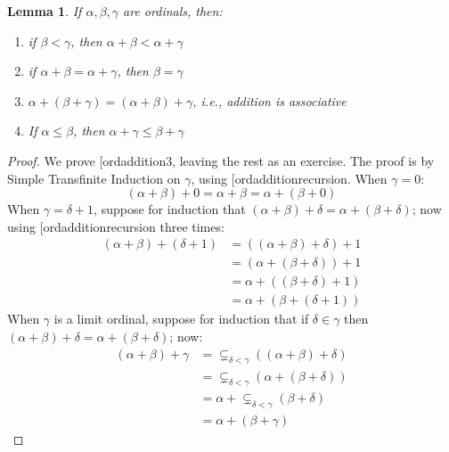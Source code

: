 \documentclass[10pt,a4paper]{article}
\makeatletter
\theoremstyle{plain}
\newtheorem{lem}[thm]{Lemma}
\theoremstyle{definition}
\theoremstyle{remark}
\newcommand*{\ollabel}[1]{\label{#1}}
\newcommand{\olref}{\@ifnextchar[{\olref@i}{\olref@final}}
\def\olref@i[#1]{\@ifnextchar[{\olref@ii}{\olref@final}}
\def\olref@ii[#1]{\@ifnextchar[{\olref@iii}{\olref@final}}
\def\olref@iii[#1]{\olref@final}
\def\olref@final#1{\ref{#1}}
\providecommand{\ordplus}{\mathbin{+}}
\providecommand{\supstrict}{\subsetneq}
\makeatother
\begin{document}
\begin{lem}\ollabel{ordinaladditionisnice}
If $\alpha, \beta, \gamma$ are ordinals, then:
\begin{enumerate}
	\item\ollabel{ordaddition1} if $\beta < \gamma$, then $\alpha
	\ordplus  \beta < \alpha \ordplus  \gamma$
	\item\ollabel{ordaddition2} if $\alpha \ordplus  \beta =
	\alpha\ordplus \gamma$, then $\beta = \gamma$
	\item\ollabel{ordaddition3}  $\alpha \ordplus  (\beta \ordplus
	\gamma) = (\alpha \ordplus  \beta) \ordplus  \gamma$, i.e.,
	addition is associative
	\item\ollabel{ordaddition4}  If $\alpha \leq \beta$, then $\alpha
	\ordplus  \gamma \leq \beta \ordplus \gamma$
\end{enumerate}
\end{lem}

\begin{proof}
We prove \olref{ordaddition3}, leaving the rest as an exercise. The
proof is by Simple Transfinite Induction on $\gamma$, using
\olref{ordadditionrecursion}. When $\gamma = 0$:
\[
(\alpha \ordplus  \beta) \ordplus  0 = \alpha \ordplus  \beta  = \alpha \ordplus  (\beta \ordplus  0)
\]
When $\gamma = \delta\ordplus 1$, suppose for induction that $(\alpha
\ordplus  \beta) \ordplus  \delta = \alpha \ordplus  (\beta \ordplus
\delta)$; now using \olref{ordadditionrecursion} three times:
\begin{align*}
	(\alpha \ordplus  \beta) \ordplus  (\delta \ordplus  1) & = ((\alpha \ordplus  \beta) \ordplus  \delta)\ordplus 1\\
	& = (\alpha \ordplus  (\beta \ordplus  \delta)) \ordplus  1\\
	& = \alpha \ordplus  ((\beta \ordplus  \delta)\ordplus 1)\\
	& = \alpha \ordplus  (\beta \ordplus  (\delta\ordplus 1))
\end{align*}	
When $\gamma$ is a limit ordinal, suppose for induction that if
$\delta \in \gamma$ then $(\alpha \ordplus  \beta) \ordplus  \delta =
\alpha \ordplus  (\beta \ordplus  \delta)$; now:
\begin{align*}
	(\alpha \ordplus  \beta) \ordplus  \gamma & = \supstrict_{\delta < \gamma}((\alpha \ordplus  \beta) \ordplus  \delta) \\
	&= \supstrict_{\delta < \gamma}(\alpha \ordplus  (\beta \ordplus  \delta))\\
	&= \alpha \ordplus  \supstrict_{\delta < \gamma}(\beta \ordplus  \delta)\\
	& = \alpha \ordplus  (\beta \ordplus  \gamma)
\end{align*}
\end{proof}
\end{document}
